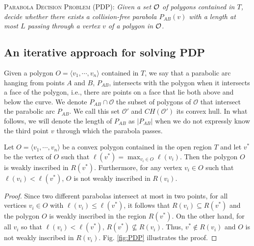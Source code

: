 \vspace{.25cm}
\textsc{Parabola Decision Problem (PDP):} 
\emph{Given a set $\cal O$ of polygons %
contained in $T$, decide whether there exists a collision-free parabola $P_{AB}(v)$ with a length at most $L$ passing through a vertex $v$ of a polygon in $\cal O$.}






\subsection{An iterative approach for solving PDP}
\label{solvingPDP}
Given a polygon $O=\langle v_1,\cdots,v_n\rangle$ contained in  $T$, we say that a parabolic arc hanging from points $A$ and $B$, $P_{AB}$, intersects with the polygon when it intersects a face of the polygon, i.e., there are points on a face that lie both above and below the curve. We denote  $P_{AB} \cap \mathcal{O}$  the subset of polygons of $\mathcal{O}$ that intersect the parabolic arc $P_{AB}$. We call this set $\mathcal{O'}$ and $CH(\mathcal{O'})$ its convex hull. In what follows, we will denote the length of $P_{AB}$ as $|P_{AB}|$ when we do not expressly know the third point $v$ through which the parabola passes.


\begin{lemma} \label{cor: longest_parabola}  
  Let $O=\langle v_1,\cdots,v_n\rangle$ be a convex polygon contained in the open region $T$ and let $v^*$ be the vertex of $O$ such that $\ell(v^*)=\max_{v_i \in O}\ell(v_i).$ Then the polygon $O$ is weakly inscribed in $R(v^*)$. 
  Furthermore, for any vertex $v_i \in O$ such that $\ell(v_i)<\ell(v^*)$, $O$ is not weakly inscribed in $R(v_i)$.
\end{lemma}	

\begin{proof}
Since two different parabolas intersect at most in two points, for all vertices $v_i\in O$ with $\ell(v_i) \leq \ell(v^*)$, it follows that $R(v_i)\subseteq R(v^*)$ and
the polygon $O$ is weakly inscribed in the region $R(v^*)$. On the other hand, for all $v_i$ so that $\ell(v_i) < \ell(v^*)$, $R(v^*) \nsubseteq R(v_i)$. Thus, $v^* \notin R(v_i)$ and $O$ is not weakly inscribed in $R(v_i)$. Fig. \ref{fig:PDP} illustrates the proof.
\end{proof}

